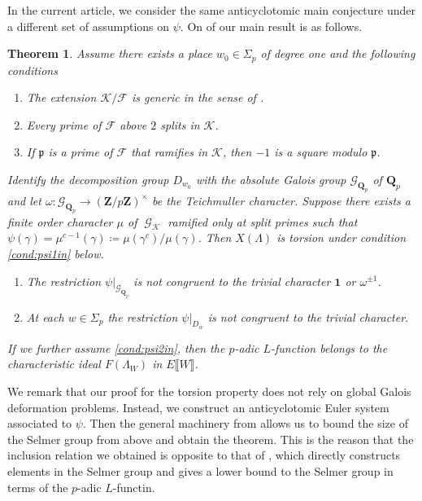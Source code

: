 \documentclass[leqno]{amsart}
\newtheorem{thm}{Theorem}[section]
\theoremstyle{definition}
\theoremstyle{remark}
\newcommand{\id}{\mathbf{1}}
\newcommand{\Z}{{\mathbf{Z}}}
\newcommand{\Qp}{\mathbf{Q}_p}
\DeclareMathOperator{\Gal}{\mathcal{G}}
\newcommand{\fp}{\mathfrak{p}}
\newcommand{\Gp}{\mathcal{G}_{\Qp}} %
\newcommand{\F}{{\mathcal{F}}} %
\newcommand{\K}{{\mathcal{K}}} %
\begin{document}
In the current article, we consider the same
anticyclotomic main conjecture under
a different set of assumptions on $\psi$.
On of our main result is as follows.

\begin{thm}

Assume there exists a place $w_0\in\Sigma_p$ of degree one
and the following conditions
\begin{enumerate}[label=($\K$\arabic*)]
\item The extension $\K/\F$ is generic 
in the sense of \cite{Rohrlich}.
\label{cond:K2in}
\item Every prime of $\F$ above $2$ splits in $\K$.
\label{cond:K3in}
\item If $\fp$ is a prime of $\F$ that ramifies in $\K$,
then $-1$ is a square modulo $\fp$.
\label{cond:K4in}
\end{enumerate}
Identify the decomposition group $D_{w_0}$
with the absolute Galois group $\Gp$ of $\Qp$
and let $\omega\colon \Gp\to (\Z/p\Z)^\times$ be the Teichmuller character.
Suppose there exists a finite order character $\mu$ of $\Gal_\K$
ramified only at split primes such that 
$\psi(\gamma)=\mu^{c-1}(\gamma)\coloneqq\mu(\gamma^c)/\mu(\gamma)$.
Then $X(\Lambda)$ is torsion under condition \ref{cond:psi1in} below.
\begin{enumerate}[label=($\psi$\arabic*)]
\item  The restriction $\psi\vert_{\Gp}$ is not congruent
to the trivial character $\id$ or $\omega^{\pm1}$.
\label{cond:psi1in}
\item At each $w\in\Sigma_p$ the restriction 
$\psi\vert_{D_w}$ is not congruent
to the trivial character.
\label{cond:psi2in}
\end{enumerate}
If we further assume \ref{cond:psi2in},
then the $p$-adic $L$-function belongs to 
the characteristic ideal $F(\Lambda_W)$ in 
$E\llbracket W\rrbracket$.

\end{thm}

We remark that our proof for the torsion property
does not rely on global Galois deformation problems.
Instead, we construct 
an anticyclotomic Euler system associated to $\psi$.
Then the general machinery from \cite{Rubin}
allows us to bound the size
of the Selmer group from above and obtain the theorem.
This is the reason that the inclusion relation
we obtained is opposite to that of \cite{HT94},
which directly constructs elements in the Selmer 
group and gives a lower bound to the Selmer group
in terms of the $p$-adic $L$-functin.
\end{document}
